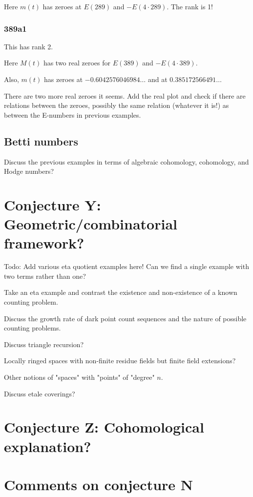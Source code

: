 \documentclass[paper=a4, fontsize=11pt]{scrartcl} %
\numberwithin{equation}{section} %
\numberwithin{figure}{section} %
\numberwithin{table}{section} %
\begin{document}
Here $m(t)$ has zeroes at $E(289)$ and $-E(4 \cdot 289)$. The rank is 1!

\subsubsection{389a1}

This has rank 2.

Here $M(t)$ has two real zeroes for $E(389)$ and $-E(4 \cdot 389)$.

Also, $m(t)$ has zeroes at $-0.6042576046984\ldots$ and at $0.385172566491\ldots$

There are two more real zeroes it seems. Add the real plot and check if there are relations between the zeroes, possibly the same relation (whatever it is!) as between the E-numbers in previous examples.

\subsection{Betti numbers}

Discuss the previous examples in terms of algebraic cohomology, cohomology, and Hodge numbers?

\section{Conjecture Y: Geometric/combinatorial framework?}

Todo: Add various eta quotient examples here! Can we find a single example with two terms rather than one?

Take an eta example and contrast the existence and non-existence of a known counting problem.

Discuss the growth rate of dark point count sequences and the nature of possible counting problems.

Discuss triangle recursion?

Locally ringed spaces with non-finite residue fields but finite field extensions?

Other notions of "spaces" with "points" of "degree" $n$.

Discuss etale coverings?

\section{Conjecture Z: Cohomological explanation?}


\section{Comments on conjecture N}
\end{document}
